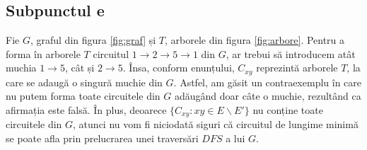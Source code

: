 \documentclass{article}
\begin{document}
\subsection*{\fontsize{16}{30}\selectfont Subpunctul e}
{\fontsize{14}{16}\selectfont
Fie $G$, graful din figura \ref{fig:graf} și $T$, arborele din figura \ref{fig:arbore}. Pentru a forma în arborele $T$ circuitul $1 \rightarrow 2 \rightarrow 5 \rightarrow 1$ din $G$, ar trebui să introducem atât muchia $1 \rightarrow 5$, cât și $2 \rightarrow 5$. Însa, conform enunțului, $C_{xy}$ reprezintă arborele $T$, la care se adaugă o singură muchie din $G$. Astfel, am găsit un contraexemplu în care nu putem forma toate circuitele din $G$ adăugând doar câte o muchie, rezultând ca afirmația este falsă. În plus, deoarece $\lbrace C_{xy} : xy \in E \backslash E' \rbrace$ nu conține toate circuitele din $G$, atunci nu vom fi niciodată siguri că circuitul de lungime minimă se poate afla prin prelucrarea unei traversări $DFS$ a lui $G$.
}
\end{document}
